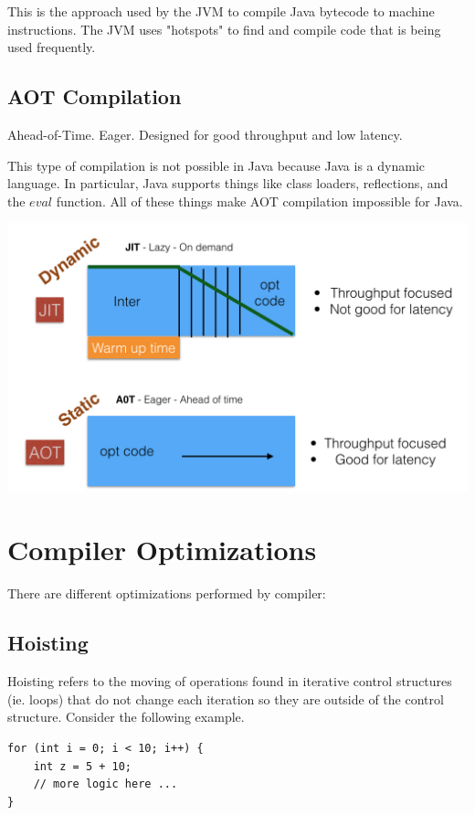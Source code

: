 \documentclass[twoside]{article}
\begin{document}
This is the approach used by the JVM to compile Java bytecode to machine instructions. The JVM uses "hotspots" to find and compile code that is being used frequently.

\subsection{AOT Compilation}

Ahead-of-Time. Eager. Designed for good throughput and low latency.

This type of compilation is not possible in Java because Java is a dynamic language. In particular, Java supports things like class loaders, reflections, and the $eval$ function. All of these things make AOT compilation impossible for Java.

\includegraphics[width=\textwidth]{compilers.png}

\section{Compiler Optimizations}
There are different optimizations performed by compiler:

\subsection{Hoisting}

Hoisting refers to the moving of operations found in iterative control structures (ie. loops) that do not change each iteration so they are outside of the control structure. Consider the following example.

\begin{verbatim}
for (int i = 0; i < 10; i++) {
    int z = 5 + 10;
    // more logic here ...
}
\end{verbatim}
\end{document}
